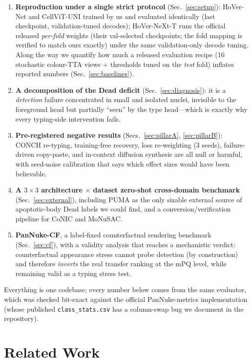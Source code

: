 \documentclass[11pt]{article}
\begin{document}
\begin{enumerate}
\item \textbf{Reproduction under a single strict protocol} (Sec.~\ref{sec:setup}): HoVer-Net and
CellViT-UNI trained by us and evaluated identically (last checkpoint, validation-tuned decodes);
HoVer-NeXt-T runs the official released \emph{per-fold} weights (their val-selected checkpoints;
the fold mapping is verified to match ours exactly) under the same validation-only decode tuning. Along the way we quantify how much a released
evaluation recipe (16 stochastic colour-TTA views + thresholds tuned on the \emph{test} fold)
inflates reported numbers (Sec.~\ref{sec:baselines}).
\item \textbf{A decomposition of the Dead deficit} (Sec.~\ref{sec:diagnosis}): it is a
\emph{detection} failure concentrated in small and isolated nuclei, invisible to the foreground
head but partially ``seen'' by the type head---which is exactly why every typing-side
intervention fails.
\item \textbf{Pre-registered negative results} (Secs.~\ref{sec:pillarA}, \ref{sec:pillarB}):
CONCH re-typing, training-free recovery, loss re-weighting (3 seeds), failure-driven
copy-paste, and in-context diffusion synthesis are all null or harmful, with seed-noise
calibration that says which effect sizes would have been believable.
\item \textbf{A $3{\times}3$ architecture $\times$ dataset zero-shot cross-domain benchmark}
(Sec.~\ref{sec:external}), including PUMA as the only sizable external source of apoptotic-body
Dead labels we could find, and a conversion/verification pipeline for CoNIC and MoNuSAC.
\item \textbf{PanNuke-CF}, a label-fixed counterfactual rendering benchmark
(Sec.~\ref{sec:cf}), with a validity analysis that reaches a mechanistic verdict: counterfactual
appearance stress cannot probe detection (by construction) and therefore \emph{inverts} the
real transfer ranking at the mPQ level, while remaining valid as a typing stress test.
\end{enumerate}

Everything is one codebase; every number below comes from the same evaluator, which was checked
bit-exact against the official PanNuke-metrics implementation (whose published
\texttt{class\_stats.csv} has a column-swap bug we document in the repository).

\section{Related Work}
\label{sec:related}
\end{document}
